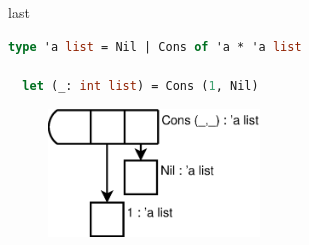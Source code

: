 \documentclass[10pt, mathserif]{beamer}
\theoremstyle{definition}
\begin{document}
\begin{frame}[fragile]{last}

  \begin{lstlisting}[language=ml]
  type 'a list = Nil | Cons of 'a * 'a list

  let (_: int list) = Cons (1, Nil)
  \end{lstlisting}

  \begin{figure}
  \centering
  \includegraphics[width=0.5\textwidth]{img1.eps}
  \end{figure}
\end{frame}
\end{document}
